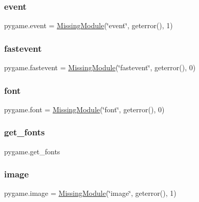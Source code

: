 \mbox{\label{namespacepygame_a0821534ff2a1c38c6c73a43742daebb5}} 
\subsubsection{\texorpdfstring{event}{event}}
{\footnotesize\ttfamily pygame.\+event = \hyperlink{classpygame_1_1_missing_module}{Missing\+Module}(\char`\"{}event\char`\"{}, geterror(), 1)}

\mbox{\label{namespacepygame_ae47d8cf1ce2ded3ecad9fd088168290e}} 
\subsubsection{\texorpdfstring{fastevent}{fastevent}}
{\footnotesize\ttfamily pygame.\+fastevent = \hyperlink{classpygame_1_1_missing_module}{Missing\+Module}(\char`\"{}fastevent\char`\"{}, geterror(), 0)}

\mbox{\label{namespacepygame_abb19afafd341333a96759d8d39829f0e}} 
\subsubsection{\texorpdfstring{font}{font}}
{\footnotesize\ttfamily pygame.\+font = \hyperlink{classpygame_1_1_missing_module}{Missing\+Module}(\char`\"{}font\char`\"{}, geterror(), 0)}

\mbox{\label{namespacepygame_a81c3c76aaedffb4ca4f45d133b3c8a75}} 
\subsubsection{\texorpdfstring{get\+\_\+fonts}{get\_fonts}}
{\footnotesize\ttfamily pygame.\+get\+\_\+fonts}

\mbox{\label{namespacepygame_a0d457af554c5ed9426728f64e80cd688}} 
\subsubsection{\texorpdfstring{image}{image}}
{\footnotesize\ttfamily pygame.\+image = \hyperlink{classpygame_1_1_missing_module}{Missing\+Module}(\char`\"{}image\char`\"{}, geterror(), 1)}

